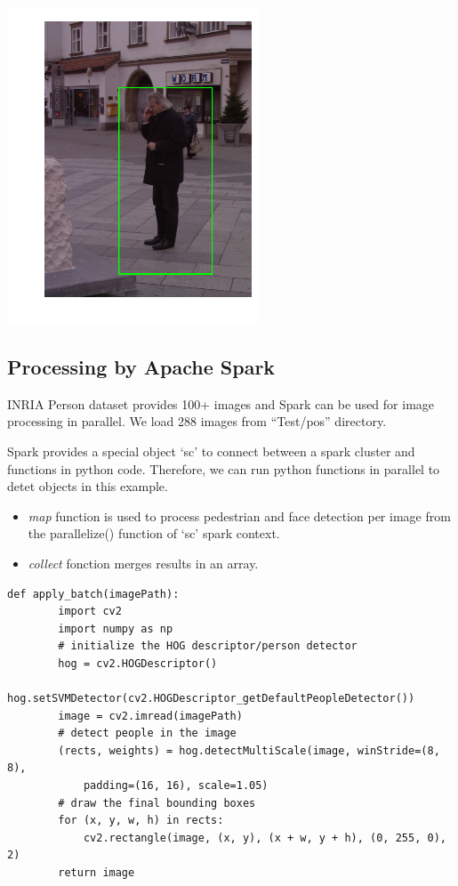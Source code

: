 \includegraphics{facedetection_files/facedetection_62_9.png}

\subsection{Processing by Apache
Spark}\label{processing-by-apache-spark}

INRIA Person dataset provides 100+ images and Spark can be used for
image processing in parallel. We load 288 images from ``Test/pos''
directory.

Spark provides a special object `sc' to connect between a spark cluster
and functions in python code. Therefore, we can run python functions in
parallel to detet objects in this example.

\begin{itemize}
\tightlist
\item
  \emph{map} function is used to process pedestrian and face detection
  per image from the parallelize() function of `sc' spark context.
\item
  \emph{collect} fonction merges results in an array.
\end{itemize}

\begin{verbatim}
def apply_batch(imagePath):
        import cv2
        import numpy as np
        # initialize the HOG descriptor/person detector
        hog = cv2.HOGDescriptor()
        hog.setSVMDetector(cv2.HOGDescriptor_getDefaultPeopleDetector())
        image = cv2.imread(imagePath)
        # detect people in the image
        (rects, weights) = hog.detectMultiScale(image, winStride=(8, 8),
            padding=(16, 16), scale=1.05)
        # draw the final bounding boxes
        for (x, y, w, h) in rects:
            cv2.rectangle(image, (x, y), (x + w, y + h), (0, 255, 0), 2)
        return image
\end{verbatim}

